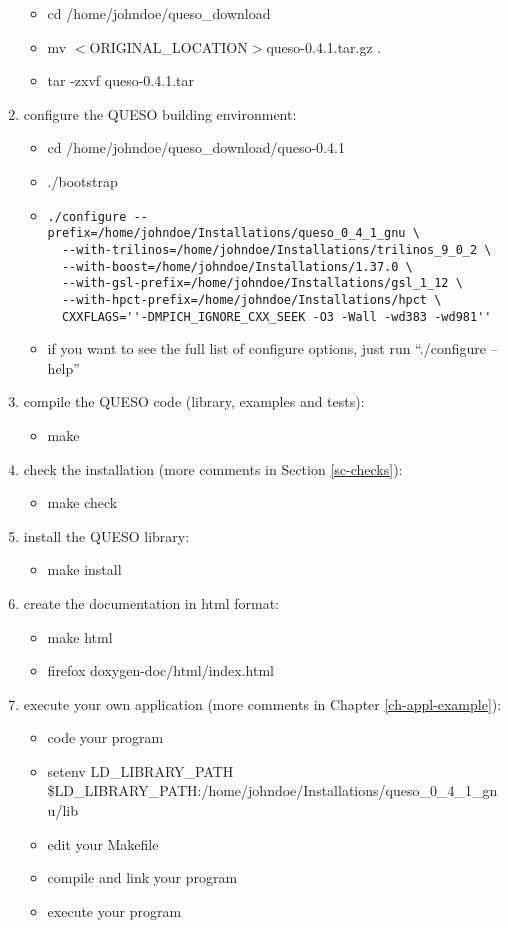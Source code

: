 \begin{enumerate}
{\begin{itemize}
\item cd /home/johndoe/queso\_download
\item mv $<$ORIGINAL\_LOCATION$>$queso-0.4.1.tar.gz .
\item tar -zxvf queso-0.4.1.tar
\end{itemize}
}
\item {configure the QUESO building environment:
\begin{itemize}
\item cd /home/johndoe/queso\_download/queso-0.4.1
\item ./bootstrap
\item {
\begin{verbatim}
./configure --prefix=/home/johndoe/Installations/queso_0_4_1_gnu \
  --with-trilinos=/home/johndoe/Installations/trilinos_9_0_2 \
  --with-boost=/home/johndoe/Installations/1.37.0 \
  --with-gsl-prefix=/home/johndoe/Installations/gsl_1_12 \
  --with-hpct-prefix=/home/johndoe/Installations/hpct \
  CXXFLAGS=''-DMPICH_IGNORE_CXX_SEEK -O3 -Wall -wd383 -wd981''
\end{verbatim}
}
\item if you want to see the full list of configure options, just run ``./configure --help''
\end{itemize}
}
\item {compile the QUESO code (library, examples and tests):
\begin{itemize}
\item make
\end{itemize}
}
\item {check the installation (more comments in Section \ref{sc-checks}):
\begin{itemize}
\item make check
\end{itemize}
}
\item {install the QUESO library:
\begin{itemize}
\item make install
\end{itemize}
}
\item {create the documentation in html format:
\begin{itemize}
\item make html
\item firefox doxygen-doc/html/index.html
\end{itemize}
}
\item {execute your own application (more comments in Chapter \ref{ch-appl-example}):
\begin{itemize}
\item code your program
\item setenv LD\_LIBRARY\_PATH \$LD\_LIBRARY\_PATH:/home/johndoe/Installations/queso\_0\_4\_1\_gnu/lib
\item edit your Makefile
\item compile and link your program
\item execute your program
\end{itemize}
}
\end{enumerate}

